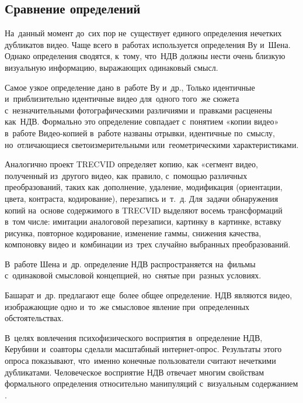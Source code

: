 \documentclass{.local/lib/classes/ndvr-super-article-standalone}
\begin{document}
    \pagebreak

    \subsection{Сравнение определений}

    На~данный момент до~сих пор не~существует единого
    определения нечетких дубликатов видео.
    Чаще всего в~работах используется определения Ву и~Шена.
    Однако определения сводятся, к~тому, что~НДВ должны нести очень
    близкую визуальную информацию, выражающих одинаковый смысл.

    Самое узкое определение дано в~работе Ву и~др.,
    Только идентичные и~приблизительно идентичные видео
    для~одного того~же сюжета с~незначительными фотографическими различиями
    и~правками расценены как~НДВ.
    Формально это определение совпадает
    с~понятием «копии видео» в~работе \cite{Law-To:2007}
    Видео-копией в~работе названы отрывки, идентичные по~смыслу,
    но~отличающиеся светоизмерительными или~геометрическими характеристиками.

    Аналогично проект TRECVID \cite{Over:2011} определяет копию, как
    «сегмент видео, полученный из~другого видео,
    как~правило, с~помощью различных преобразований,
    таких как~дополнение, удаление, модификация
    (ориентации, цвета, контраста, кодирование),
    перезапись и~т.~д.
    Для~задачи обнаружения копий на~основе 
    содержимого в TRECVID выделяют восемь
    трансформаций в~том числе:
        имитации аналоговой перезаписи,
        картинку в~картинке,
        вставку рисунка,
        повторное кодирование,
        изменение гаммы,
        снижения качества,
        компоновку видео
    и~комбинации из~трех случайно выбранных преобразований.

    В~работе Шена и~др. \cite{Shen:2007} определение НДВ распространяется
    на~фильмы с~одинаковой смысловой концепцией, но~снятые при~разных условиях.

    Башарат и~др. \cite{Basharat:2008}  
    предлагают еще~более общее определение.
    НДВ являются видео, изображающие одно и~то~же смысловое явление
    при~определенных обстоятельствах.


    В~целях вовлечения психофизического восприятия в~определение НДВ,
    Керубини и~соавторы \cite{Cherubini:2009} сделали масштабный интернет-опрос.
    Результаты этого опроса показывают, что~именно конечные пользователи
    считают нечеткими дубликатами.
    Человеческое восприятие НДВ отвечает
    многим свойствам формального определения
    относительно манипуляций с~визуальным содержанием
    \cite{Wu:2007a, Shen:2007}.
\end{document}
